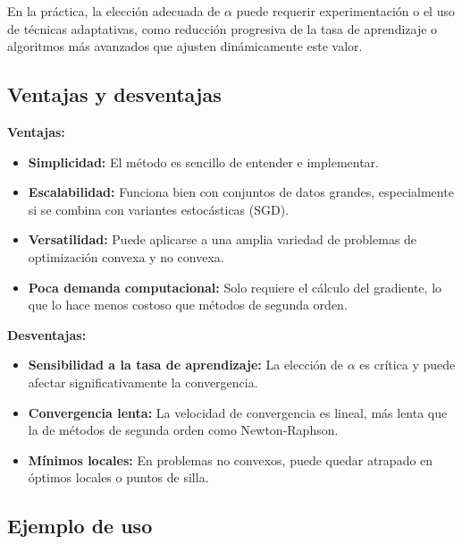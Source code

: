\documentclass[12pt, letterpaper,conference]{IEEEtran}
\begin{document}
En la práctica, la elección adecuada de \( \alpha \) puede requerir experimentación o el uso de técnicas adaptativas, como reducción progresiva de la tasa de aprendizaje o algoritmos más avanzados que ajusten dinámicamente este valor.



\vspace{0.25cm}

\subsection{Ventajas y desventajas}

\textbf{Ventajas:}
\begin{itemize}
    \item \textbf{Simplicidad:} El método es sencillo de entender e implementar.
    \item \textbf{Escalabilidad:} Funciona bien con conjuntos de datos grandes, especialmente si se combina con variantes estocásticas (SGD).
    \item \textbf{Versatilidad:} Puede aplicarse a una amplia variedad de problemas de optimización convexa y no convexa.
    \item \textbf{Poca demanda computacional:} Solo requiere el cálculo del gradiente, lo que lo hace menos costoso que métodos de segunda orden.
\end{itemize}

\vspace{0.15cm}

\textbf{Desventajas:}
\begin{itemize}
    \item \textbf{Sensibilidad a la tasa de aprendizaje:} La elección de \( \alpha \) es crítica y puede afectar significativamente la convergencia.
    \item \textbf{Convergencia lenta:} La velocidad de convergencia es lineal, más lenta que la de métodos de segunda orden como Newton-Raphson.
    \item \textbf{Mínimos locales:} En problemas no convexos, puede quedar atrapado en óptimos locales o puntos de silla.
\end{itemize}



\vspace{0.25cm}

\subsection{Ejemplo de uso}
\end{document}
